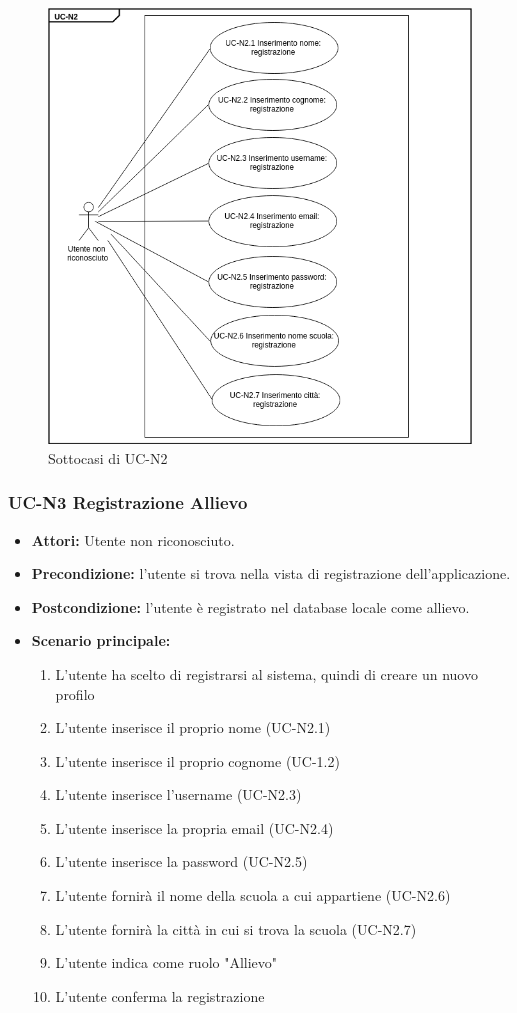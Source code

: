 \begin{figure}[htbp]
	\centering
	\includegraphics[scale=0.7]{images/UC-N2sub.png}
	\caption{Sottocasi di UC-N2}
\end{figure}


\subsubsection{UC-N3 Registrazione Allievo}
\begin{itemize}
	\item \textbf{Attori: }Utente non riconosciuto.
	\item \textbf{Precondizione: }l'utente si trova nella vista di registrazione dell'applicazione.
	\item \textbf{Postcondizione: }l'utente è registrato nel database locale come allievo.
	\item \textbf{Scenario principale: }
		\begin{enumerate}
		\item L'utente ha scelto di registrarsi al sistema, quindi di creare un nuovo profilo
		\item L'utente inserisce il proprio nome (UC-N2.1)
		\item L'utente inserisce il proprio cognome (UC-1.2)
		\item L'utente inserisce l'username (UC-N2.3)
		\item L'utente inserisce la propria email (UC-N2.4)
		\item L'utente inserisce la password (UC-N2.5)
		\item L'utente fornirà il nome della scuola a cui appartiene (UC-N2.6)
		\item L'utente fornirà la città in cui si trova la scuola (UC-N2.7)
		\item L'utente indica come ruolo "Allievo"
		\item L'utente conferma la registrazione
		\end{enumerate}
\end{itemize}

